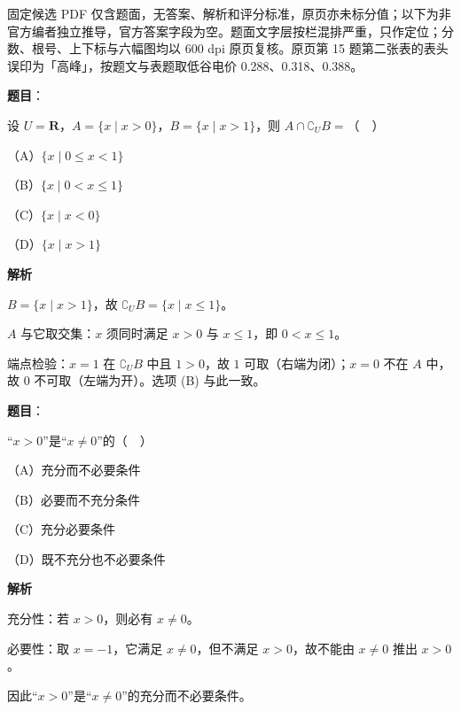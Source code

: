 

\begin{gktip}
固定候选 PDF 仅含题面，无答案、解析和评分标准，原页亦未标分值；以下为非官方编者独立推导，官方答案字段为空。题面文字层按栏混排严重，只作定位；分数、根号、上下标与六幅图均以 600 dpi 原页复核。原页第 15 题第二张表的表头误印为「高峰」，按题文与表题取低谷电价 0.288、0.318、0.388。
\end{gktip}

\begin{answer}

\textbf{题目}：

设 $U=\mathbf R$，$A=\{x\mid x>0\}$，$B=\{x\mid x>1\}$，则 $A\cap\complement_U B=$（　）

（A）$\{x\mid 0\leqslant x<1\}$

（B）$\{x\mid 0<x\leqslant 1\}$

（C）$\{x\mid x<0\}$

（D）$\{x\mid x>1\}$

\textbf{解析}

$B=\{x\mid x>1\}$，故 $\complement_U B=\{x\mid x\leqslant1\}$。

$A$ 与它取交集：$x$ 须同时满足 $x>0$ 与 $x\leqslant1$，即 $0<x\leqslant1$。

端点检验：$x=1$ 在 $\complement_U B$ 中且 $1>0$，故 $1$ 可取（右端为闭）；$x=0$ 不在 $A$ 中，故 $0$ 不可取（左端为开）。选项 (B) 与此一致。


\end{answer}
\begin{answer}

\textbf{题目}：

“$x>0$”是“$x\neq0$”的（　）

（A）充分而不必要条件

（B）必要而不充分条件

（C）充分必要条件

（D）既不充分也不必要条件

\textbf{解析}

充分性：若 $x>0$，则必有 $x\neq0$。

必要性：取 $x=-1$，它满足 $x\neq0$，但不满足 $x>0$，故不能由 $x\neq0$ 推出 $x>0$。

因此“$x>0$”是“$x\neq0$”的充分而不必要条件。


\end{answer}
